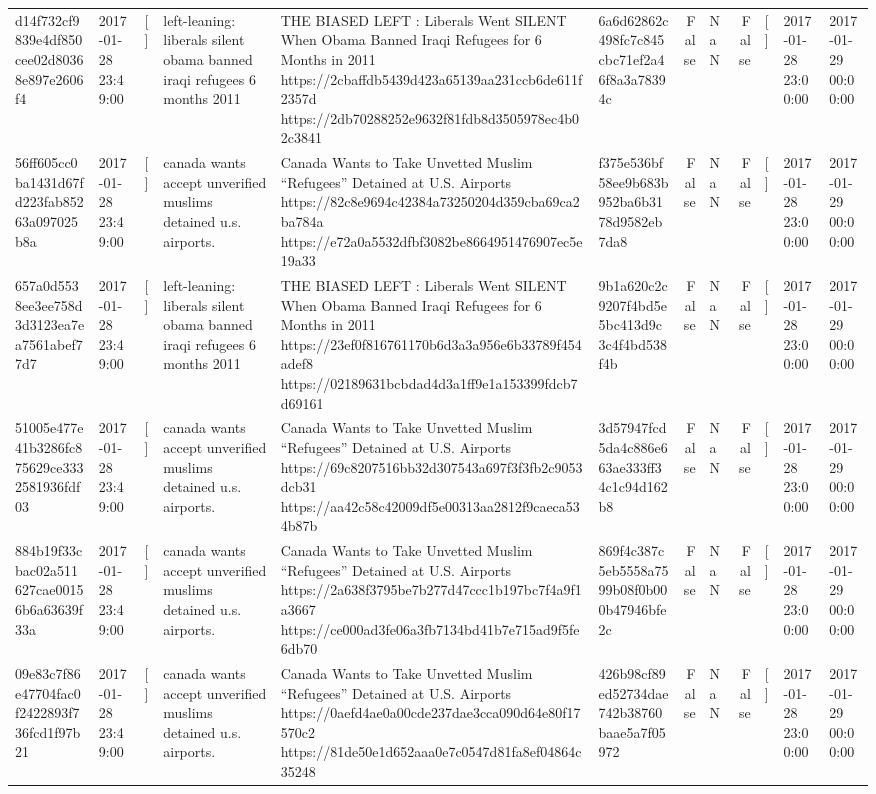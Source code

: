 \begin{tabular}{llllllrlrlll}
d14f732cf9839e4df850cee02d80368e897e2606f4 & 2017-01-28 23:49:00 & [] & left-leaning: liberals silent obama banned iraqi refugees 6 months 2011 & THE BIASED LEFT : Liberals Went SILENT When Obama Banned Iraqi Refugees for 6 Months in 2011 https://2cbaffdb5439d423a65139aa231ccb6de611f2357d https://2db70288252e9632f81fdb8d3505978ec4b02c3841 & 6a6d62862c498fc7c845cbc71ef2a46f8a3a78394c & False & NaN & False & [] & 2017-01-28 23:00:00 & 2017-01-29 00:00:00 \\
56ff605cc0ba1431d67fd223fab85263a097025b8a & 2017-01-28 23:49:00 & [] & canada wants accept unverified muslims detained u.s. airports. & Canada Wants to Take Unvetted Muslim “Refugees” Detained at U.S. Airports https://82c8e9694c42384a73250204d359cba69ca2ba784a https://e72a0a5532dfbf3082be8664951476907ec5e19a33 & f375e536bf58ee9b683b952ba6b3178d9582eb7da8 & False & NaN & False & [] & 2017-01-28 23:00:00 & 2017-01-29 00:00:00 \\
657a0d5538ee3ee758d3d3123ea7ea7561abef77d7 & 2017-01-28 23:49:00 & [] & left-leaning: liberals silent obama banned iraqi refugees 6 months 2011 & THE BIASED LEFT : Liberals Went SILENT When Obama Banned Iraqi Refugees for 6 Months in 2011 https://23ef0f816761170b6d3a3a956e6b33789f454adef8 https://02189631bcbdad4d3a1ff9e1a153399fdcb7d69161 & 9b1a620c2c9207f4bd5e5bc413d9c3c4f4bd538f4b & False & NaN & False & [] & 2017-01-28 23:00:00 & 2017-01-29 00:00:00 \\
51005e477e41b3286fc875629ce3332581936fdf03 & 2017-01-28 23:49:00 & [] & canada wants accept unverified muslims detained u.s. airports. & Canada Wants to Take Unvetted Muslim “Refugees” Detained at U.S. Airports https://69c8207516bb32d307543a697f3f3fb2c9053dcb31 https://aa42c58c42009df5e00313aa2812f9caeca534b87b & 3d57947fcd5da4c886e663ae333ff34c1c94d162b8 & False & NaN & False & [] & 2017-01-28 23:00:00 & 2017-01-29 00:00:00 \\
884b19f33cbac02a511627cae00156b6a63639f33a & 2017-01-28 23:49:00 & [] & canada wants accept unverified muslims detained u.s. airports. & Canada Wants to Take Unvetted Muslim “Refugees” Detained at U.S. Airports https://2a638f3795be7b277d47ccc1b197bc7f4a9f1a3667 https://ce000ad3fe06a3fb7134bd41b7e715ad9f5fe6db70 & 869f4c387c5eb5558a7599b08f0b000b47946bfe2c & False & NaN & False & [] & 2017-01-28 23:00:00 & 2017-01-29 00:00:00 \\
09e83c7f86e47704fac0f2422893f736fcd1f97b21 & 2017-01-28 23:49:00 & [] & canada wants accept unverified muslims detained u.s. airports. & Canada Wants to Take Unvetted Muslim “Refugees” Detained at U.S. Airports https://0aefd4ae0a00cde237dae3cca090d64e80f17570c2 https://81de50e1d652aaa0e7c0547d81fa8ef04864c35248 & 426b98cf89ed52734dae742b38760baae5a7f05972 & False & NaN & False & [] & 2017-01-28 23:00:00 & 2017-01-29 00:00:00 \\

\end{tabular}

